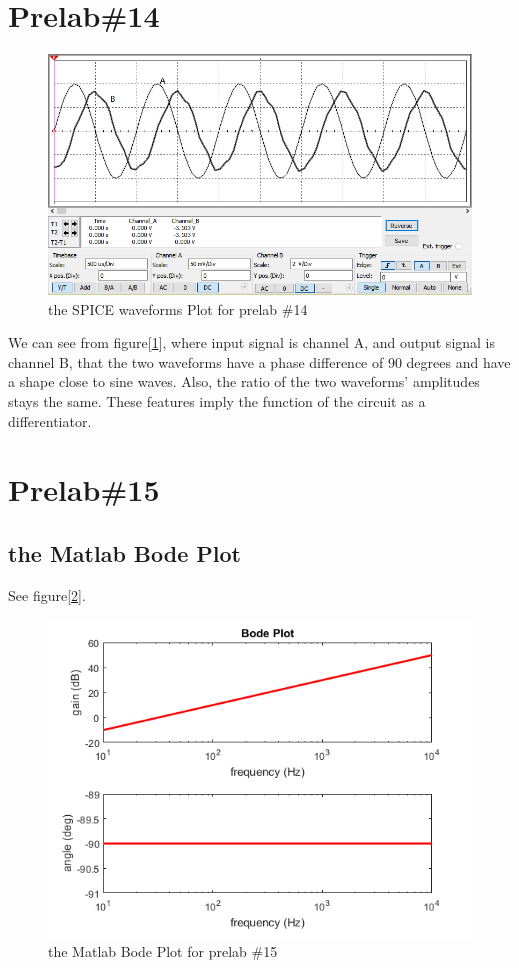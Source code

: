 \documentclass{IEEEtran}
\begin{document}
	\section{\textbf{Prelab\#14}}
	\begin{figure}[!htbp]
		\centering
		\begin{framed}
			\includegraphics[width=\linewidth]{images/14_1.PNG}
			\caption{the SPICE waveforms Plot for prelab \#14}
			\label{fig:1401}
		\end{framed}
	\end{figure}
	\phantom{ } We can see from figure[\ref{fig:1401}], where input signal is channel A, and output signal is channel B, that the two waveforms have a phase difference of 90 degrees and have a shape close to sine waves. Also, the ratio of the two waveforms' amplitudes stays the same. These features imply the function of the circuit as a differentiator.
	\section{\textbf{Prelab\#15}}
	\subsection{the Matlab Bode Plot}
	See figure[\ref{fig:1501}].
	\begin{figure}[!htbp]
		\centering
		\begin{framed}
			\includegraphics[width=\linewidth]{images/15.png}
			\caption{the Matlab Bode Plot for prelab \#15}
			\label{fig:1501}
		\end{framed}
	\end{figure}
\end{document}
